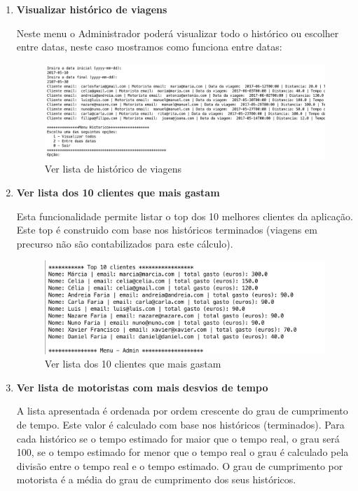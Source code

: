 \begin{enumerate}
\newpage
\item \textbf{Visualizar histórico de viagens }

Neste menu o Administrador poderá visualizar todo o histórico ou escolher entre datas, neste caso mostramos como funciona entre datas: 
\begin{figure}[htpb]
	\centering
	\includegraphics[scale=0.5]{imagem/verListaHistorico}
	\caption{Ver lista de histórico de viagens }
	\label{p3:fig:p3_verListaHistorico}
\end{figure}

\item \textbf{Ver lista dos 10 clientes que mais gastam }

Esta funcionalidade permite listar o top dos 10 melhores clientes da aplicação. 
Este top é construido com base nos históricos terminados (viagens em precurso não são contabilizados para este cálculo). 

\begin{figure}[htpb]
	\centering
	\includegraphics[scale=0.5]{imagem/verClientesMaisGastam}
	\caption{Ver  lista dos 10 clientes que mais gastam  }
	\label{p3:fig:p3_verClientesMaisGastam}
\end{figure}

\item \textbf{Ver lista de motoristas com mais desvios de tempo }

A lista apresentada é ordenada por ordem crescente do grau de cumprimento de tempo. Este valor é calculado com base nos históricos (terminados). Para cada histórico se o tempo estimado for maior que o tempo real, o grau será 100, se o tempo estimado for menor que o tempo real o grau é calculado pela divisão entre o tempo real e o tempo estimado. O grau de cumprimento por motorista é a média do grau de cumprimento dos seus históricos.  


\end{enumerate}
